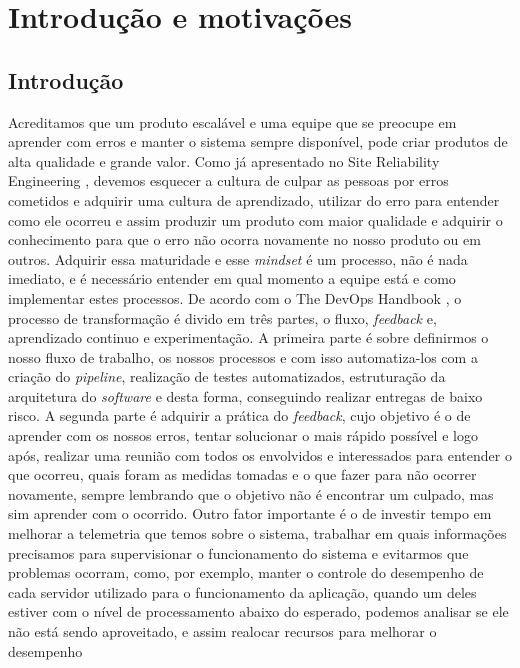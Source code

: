 \part{Introdução e motivações}
  \chapter{Introdução}
    Acreditamos que um produto escalável e uma equipe que se preocupe em aprender
    com erros e manter o sistema sempre disponível, pode criar produtos de alta
    qualidade e grande valor. Como já apresentado no Site Reliability Engineering
    \cite{SiteReliabilityEngineering}, devemos esquecer a cultura de culpar as
    pessoas por erros cometidos e adquirir uma cultura de aprendizado, utilizar
    do erro para entender como ele ocorreu e assim produzir um produto com maior
    qualidade e adquirir o conhecimento para que o erro não ocorra novamente no
    nosso produto ou em outros. Adquirir essa maturidade e esse \textit{mindset}
    é um processo, não é nada imediato, e é necessário entender em qual momento
    a equipe está e como implementar estes processos. \newline
    De acordo com o The DevOps Handbook \cite{TheDevOpsHandbook}, o processo de
    transformação é divido em três partes, o fluxo, \textit{feedback} e, aprendizado
    continuo e experimentação. A primeira parte é sobre definirmos o nosso fluxo
    de trabalho, os nossos processos e com isso automatiza-los com a criação do
    \textit{pipeline}, realização de testes automatizados, estruturação da arquitetura
    do \textit{software} e desta forma, conseguindo realizar entregas de baixo
    risco. A segunda parte é adquirir a prática do \textit{feedback}, cujo objetivo
    é o de aprender com os nossos erros, tentar solucionar o mais rápido possível
    e logo após, realizar uma reunião com todos os envolvidos e interessados para
    entender o que ocorreu, quais foram as medidas tomadas e o que fazer para não
    ocorrer novamente, sempre lembrando que o objetivo não é encontrar um culpado,
    mas sim aprender com o ocorrido. Outro fator importante é o de investir tempo
    em melhorar a telemetria que temos sobre o sistema, trabalhar em quais informações
    precisamos para supervisionar o funcionamento do sistema e evitarmos que
    problemas ocorram, como, por exemplo, manter o controle do desempenho de cada
    servidor utilizado para o funcionamento da aplicação, quando um deles estiver
    com o nível de processamento abaixo do esperado, podemos analisar se ele não
    está sendo aproveitado, e assim realocar recursos para melhorar o desempenho
